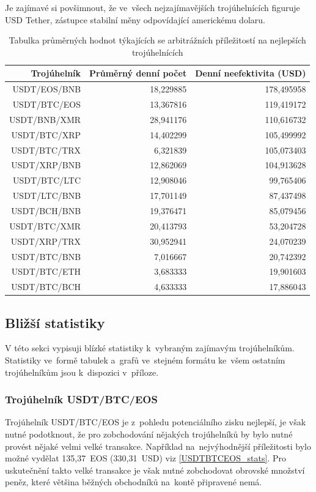 \documentclass[thesis=B,czech]{FITthesis}[2019/03/21]
\begin{document}
Je zajímavé si povšimnout, že ve~všech nejzajímavějších trojúhelnících figuruje USD Tether, zástupce stabilní měny odpovídající americkému dolaru.


\begin{table}\centering
\caption{Tabulka průměrných hodnot týkajících se arbitrážních příležitostí na nejlepších trojúhelnících}
\label{table_combined_best}
\begin{tabular}{|| r | r | r ||}\hline Trojúhelník & Průměrný denní počet & Denní neefektivita (USD)\\ [0.5ex]
 \hline
 \hline USDT/EOS/BNB & 18,229885 & 178,495958\\ 
 \hline USDT/BTC/EOS & 13,367816 & 119,419172\\ 
 \hline USDT/BNB/XMR & 28,941176 & 110,616732\\ 
 \hline USDT/BTC/XRP & 14,402299 & 105,499992\\ 
 \hline USDT/BTC/TRX & 6,321839 & 105,073403\\ 
 \hline USDT/XRP/BNB & 12,862069 & 104,913628\\ 
 \hline USDT/BTC/LTC & 12,908046 & 99,765406\\ 
 \hline USDT/LTC/BNB & 17,701149 & 87,437498\\ 
 \hline USDT/BCH/BNB & 19,376471 & 85,079456\\ 
 \hline USDT/BTC/XMR & 20,413793 & 53,204728\\ 
 \hline USDT/XRP/TRX & 30,952941 & 24,070239\\ 
 \hline USDT/BTC/BNB & 7,016667 & 20,742392\\ 
 \hline USDT/BTC/ETH & 3,683333 & 19,901603\\ 
 \hline USDT/BTC/BCH & 4,633333 & 17,886043\\ 
 \hline
\end{tabular}
\end{table}

\subsection{Bližší statistiky}
V této sekci vypisuji blízké statistiky k~vybraným zajímavým trojúhelníkům. Statistiky ve~formě tabulek a~grafů ve~stejném formátu ke~všem ostatním trojúhelníkům jsou k~dispozici v~příloze.

\subsubsection{Trojúhelník USDT/BTC/EOS}
Trojúhelník USDT/BTC/EOS je z~pohledu potenciálního zisku nejlepší, je však nutné podotknout, že pro zobchodování nějakých trojúhelníků by bylo nutné provést nějaké velmi velké transakce. Například na~nejvýhodnější příležitosti bylo možné vydělat 135,37~EOS (330,31~USD) viz \ref{USDTBTCEOS_stats}. Pro uskutečnění takto velké transakce je však nutné zobchodovat obrovské množství peněz, které většina běžných obchodníků na~kontě připravené nemá.
\end{document}
